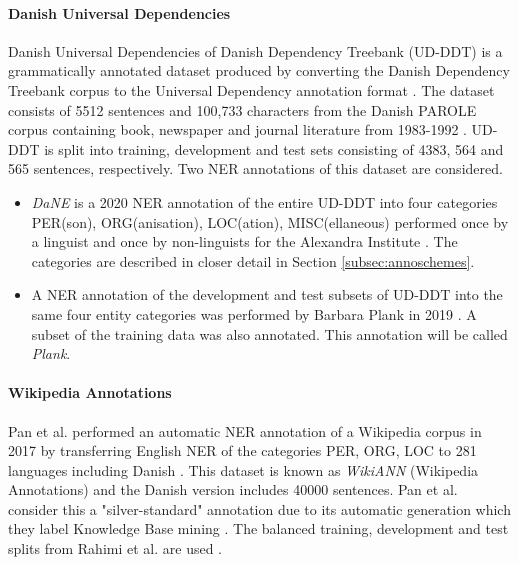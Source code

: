 \documentclass[main.tex]{subfiles}
\begin{document}
\paragraph{Danish Universal Dependencies}
Danish Universal Dependencies of Danish Dependency Treebank (UD-DDT) is a grammatically annotated dataset produced by converting the Danish Dependency Treebank corpus \cite{kromann2003ddt} to the Universal Dependency annotation format \cite{johann2015udddt}.
The dataset consists of 5512 sentences and 100,733 characters from the Danish PAROLE corpus containing book, newspaper and journal literature from 1983-1992 \cite{christensen1998parole}.
UD-DDT is split into training, development and test sets consisting of 4383, 564 and 565 sentences, respectively.
Two NER annotations of this dataset are considered.
\begin{itemize}
    \item \emph{DaNE} is a 2020 NER annotation of the entire UD-DDT into four categories PER(son), ORG(anisation), LOC(ation), MISC(ellaneous) performed once by a linguist and once by non-linguists for the Alexandra Institute \cite[Sec. 4]{hvingelby2020dane}.
    The categories are described in closer detail in Section \ref{subsec:annoschemes}.
    \item A NER annotation of the development and test subsets of UD-DDT into the same four entity categories was performed by Barbara Plank in 2019 \cite{plank2019neural}.
    A subset of the training data was also annotated.
    This annotation will be called \emph{Plank}.
\end{itemize}

\paragraph{Wikipedia Annotations}
Pan et al. performed an automatic NER annotation of a Wikipedia corpus in 2017 by transferring English NER of the categories PER, ORG, LOC to 281 languages including Danish \cite{pan2017wikiann}.
This dataset is known as \emph{WikiANN} (Wikipedia Annotations) and the Danish version includes 40000 sentences.
Pan et al. consider this a "silver-standard" annotation due to its automatic generation which they label Knowledge Base mining \cite[1946]{pan2017wikiann}.
The balanced training, development and test splits from Rahimi et al. are used \cite{rahimi2019transfer}.
\end{document}
